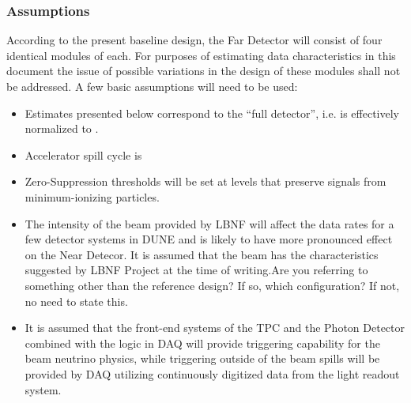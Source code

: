 \subsubsection{Assumptions}
\label{sec:detectors-sc-infrastructure-assumptions}
According to the present baseline design, the Far Detector will consist of four identical modules of \tpcmodulemass each.
For purposes of estimating data characteristics in this document the issue of possible variations in the design of these modules shall not be addressed. A few basic assumptions will need to be used:
\begin{itemize}
\item Estimates presented below correspond to the ``full detector'', i.e. is effectively
normalized to \dunedetectormass.
\item Accelerator spill cycle is \beamspillcycle
\item Zero-Suppression thresholds will be set at levels that preserve signals from minimum-ionizing particles.
\item The intensity of the beam provided by LBNF will affect the data rates for a few detector
systems in DUNE and is likely to have more pronounced effect on the Near Detecor.
It is assumed that the beam has the characteristics suggested by LBNF Project at the time of writing.{\fixme Are you referring to something other than the reference design? If so, which configuration? If not, no need to state this.}
\item It is assumed that the front-end systems of the TPC and the Photon Detector combined
with the logic in DAQ will provide triggering capability for the beam neutrino physics, while
triggering outside of the beam spills will be provided by DAQ utilizing continuously digitized
data from the light readout system.
\end{itemize}


